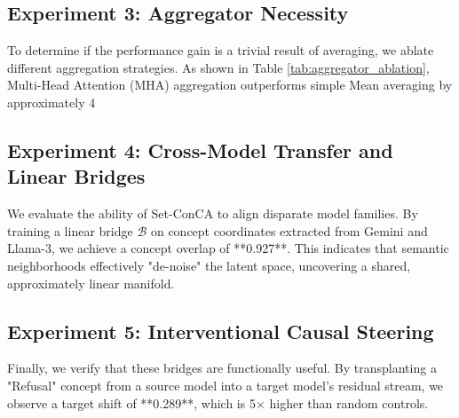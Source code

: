 \documentclass{article}
\begin{document}
\subsection{Experiment 3: Aggregator Necessity}
To determine if the performance gain is a trivial result of averaging, we ablate different aggregation strategies. As shown in Table \ref{tab:aggregator_ablation}, Multi-Head Attention (MHA) aggregation outperforms simple Mean averaging by approximately 4%

\subsection{Experiment 4: Cross-Model Transfer and Linear Bridges}
We evaluate the ability of Set-ConCA to align disparate model families. By training a linear bridge $\mathcal{B}$ on concept coordinates extracted from Gemini and Llama-3, we achieve a concept overlap of **0.927**. This indicates that semantic neighborhoods effectively "de-noise" the latent space, uncovering a shared, approximately linear manifold.

\subsection{Experiment 5: Interventional Causal Steering}
Finally, we verify that these bridges are functionally useful. By transplanting a "Refusal" concept from a source model into a target model's residual stream, we observe a target shift of **0.289**, which is 5$\times$ higher than random controls. 
\end{document}

